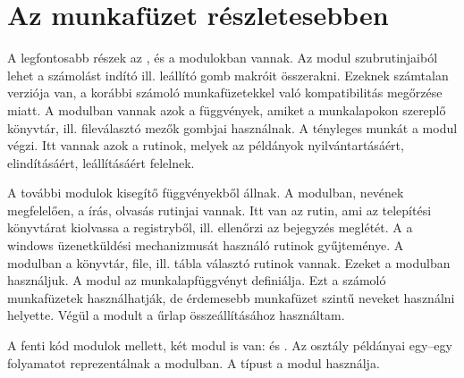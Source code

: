 

\chapter{Az  munkafüzet részletesebben}
\label{chap:5}

A legfontosabb részek az ,  és a
 modulokban vannak. Az  
modul szubrutinjaiból lehet a számolást indító ill. leállító gomb
makróit összerakni. Ezeknek számtalan verziója van, a korábbi számoló
munkafüzetekkel való kompatibilitás megőrzése 
miatt. A  modulban vannak azok a függvények, amiket a
munkalapokon szereplő 
könyvtár, ill. fileválasztó mezők gombjai használnak. A tényleges
munkát a  modul végzi. 
Itt vannak azok a rutinok, melyek az  példányok
nyilvántartásáért, elindításáért, leállításáért 
felelnek.

A további modulok %
kisegítő függvényekből állnak. A 
modulban, nevének megfelelően, a  írás, olvasás rutinjai
vannak. Itt van az rutin, ami az  telepítési könyvtárat
kiolvassa a registryből, ill. ellenőrzi az 
bejegyzés meglétét. A   
a windows üzenetküldési mechanizmusát használó rutinok gyűjteménye. A
 modulban 
a könyvtár, file, ill.  tábla választó rutinok
vannak. Ezeket  a  
modulban használjuk. A  modul az 
munkalapfüggvényt definiálja. Ezt 
a számoló munkafüzetek használhatják, de érdemesebb munkafüzet szintű
neveket használni helyette. Végül a  modult a
 űrlap összeállításához használtam. 

A fenti kód modulok mellett, két  modul is van:  és
. Az  osztály %
példányai egy–egy  folyamatot reprezentálnak a 
modulban. A  típust a  
modul használja.

